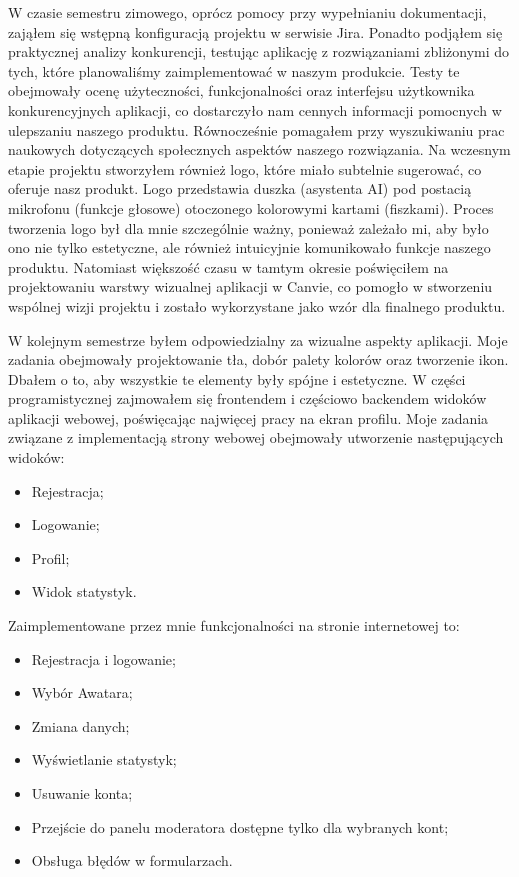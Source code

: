W czasie semestru zimowego, oprócz pomocy przy wypełnianiu dokumentacji, zająłem się wstępną konfiguracją projektu w
serwisie Jira. Ponadto podjąłem się praktycznej analizy konkurencji, testując aplikację z rozwiązaniami zbliżonymi do
tych, które planowaliśmy zaimplementować w naszym produkcie. Testy te obejmowały ocenę użyteczności, funkcjonalności oraz
interfejsu użytkownika konkurencyjnych aplikacji, co dostarczyło nam cennych informacji pomocnych w ulepszaniu naszego
produktu. Równocześnie pomagałem przy wyszukiwaniu prac naukowych dotyczących społecznych aspektów naszego rozwiązania.
Na wczesnym etapie projektu stworzyłem również logo, które miało subtelnie sugerować, co oferuje nasz produkt.
Logo przedstawia duszka (asystenta AI) pod postacią mikrofonu (funkcje głosowe) otoczonego kolorowymi kartami (fiszkami).
Proces tworzenia logo był dla mnie szczególnie ważny, ponieważ zależało mi, aby było ono nie tylko estetyczne,
ale również intuicyjnie komunikowało funkcje naszego produktu. Natomiast większość czasu w tamtym okresie poświęciłem
na projektowaniu warstwy wizualnej aplikacji w Canvie, co pomogło w stworzeniu wspólnej wizji projektu i zostało
wykorzystane jako wzór dla finalnego produktu.
\par W kolejnym semestrze byłem odpowiedzialny za wizualne aspekty aplikacji. Moje zadania obejmowały projektowanie
tła, dobór palety kolorów oraz tworzenie ikon. Dbałem o to, aby wszystkie te elementy były spójne i estetyczne.
W części programistycznej zajmowałem się frontendem i częściowo backendem widoków aplikacji webowej, poświęcając
najwięcej pracy na ekran profilu. Moje zadania związane z implementacją strony webowej obejmowały utworzenie
następujących widoków:

\begin{itemize}
    \item Rejestracja;
    \item Logowanie;
    \item Profil;
    \item Widok statystyk.
\end{itemize}

Zaimplementowane przez mnie funkcjonalności na stronie internetowej to:

\begin{itemize}
    \item Rejestracja i logowanie;
    \item Wybór Awatara;
    \item Zmiana danych;
    \item Wyświetlanie statystyk;
    \item Usuwanie konta;
    \item Przejście do panelu moderatora dostępne tylko dla wybranych kont;
    \item Obsługa błędów w formularzach.
\end{itemize}

